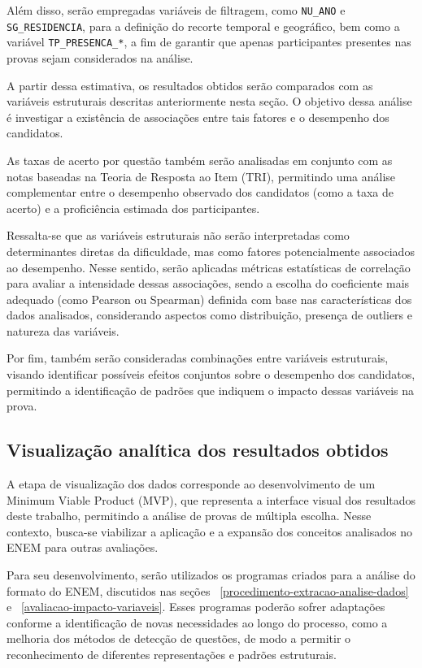 \documentclass[a4paper,10pt, twocolumn]{article}
\begin{document}
Além disso, serão empregadas variáveis de filtragem, como \texttt{NU\_ANO} e  \texttt{SG\_RESIDENCIA}, para a definição do recorte temporal e geográfico, bem como a variável \texttt{TP\_PRESENCA\_*}, a fim de garantir que apenas participantes presentes nas provas sejam considerados na análise.

A partir dessa estimativa, os resultados obtidos serão comparados com as variáveis estruturais descritas anteriormente nesta seção. O objetivo dessa análise é investigar a existência de associações entre tais fatores e o desempenho dos candidatos.

As taxas de acerto por questão também serão analisadas em conjunto com as notas baseadas na Teoria de Resposta ao Item (TRI), permitindo uma análise complementar entre o desempenho observado dos candidatos (como a taxa de acerto) e a proficiência estimada dos participantes.

Ressalta-se que as variáveis estruturais não serão interpretadas como determinantes diretas da dificuldade, mas como fatores potencialmente associados ao desempenho. Nesse sentido, serão aplicadas métricas estatísticas de correlação para avaliar a intensidade dessas associações, sendo a escolha do coeficiente mais adequado (como Pearson ou Spearman) definida com base nas características dos dados analisados, considerando aspectos como distribuição, presença de outliers e natureza das variáveis.

Por fim, também serão consideradas combinações entre variáveis estruturais, visando identificar possíveis efeitos conjuntos sobre o desempenho dos candidatos, permitindo a identificação de padrões que indiquem o impacto dessas variáveis na prova.

\subsection{Visualização analítica dos resultados obtidos} 

A etapa de visualização dos dados corresponde ao desenvolvimento de um Minimum Viable Product (MVP), que representa a interface visual dos resultados deste trabalho, permitindo a análise de provas de múltipla escolha. Nesse contexto, busca-se viabilizar a aplicação e a expansão dos conceitos analisados no ENEM para outras avaliações.

Para seu desenvolvimento, serão utilizados os programas criados para a análise do formato do ENEM, discutidos nas seções ~\ref{procedimento-extracao-analise-dados} e ~\ref{avaliacao-impacto-variaveis}. Esses programas poderão sofrer adaptações conforme a identificação de novas necessidades ao longo do processo, como a melhoria dos métodos de detecção de questões, de modo a permitir o reconhecimento de diferentes representações e padrões estruturais.
\end{document}
